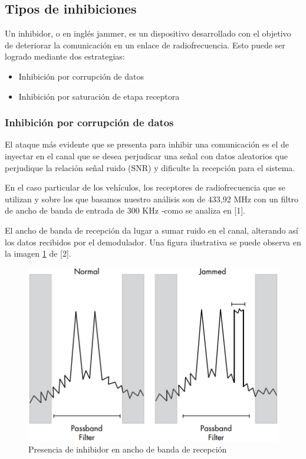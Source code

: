 \documentclass[12pt]{report}
\begin{document}
\subsection{Tipos de inhibiciones}

Un inhibidor, o en inglés jammer, es un dispositivo desarrollado con el objetivo de deteriorar la comunicación en un enlace de 
radiofrecuencia. Esto puede ser logrado mediante dos estrategias:

\begin{itemize}
    \item Inhibición por corrupción de datos
    \item Inhibición por saturación de etapa receptora

\end{itemize}

\subsubsection{Inhibición por corrupción de datos}

El ataque más evidente que se presenta para inhibir una comunicación es el de inyectar en el canal que se desea perjudicar una señal con 
datos aleatorios que perjudique la relación señal ruido (SNR) y dificulte la recepción para el sistema. \par
En el caso particular de los vehículos, los receptores de radiofrecuencia que se utilizan y sobre los que basamos nuestro análisis
son de 433,92 MHz con un filtro de ancho de banda de entrada de 300 KHz -como se analiza en [1].\par
El ancho de banda de recepción da lugar a sumar ruido en el canal, alterando así los datos recibidos por el demodulador. Una figura
ilustrativa se puede observa en la imagen \ref{fpb_jam} de [2].

\begin{figure}[htb]
	\centering
	\includegraphics[scale=0.8]{fpb_jam.png}
	\caption{Presencia de inhibidor en ancho de banda de recepción}
	\label{fpb_jam}
\end{figure}
\end{document}
